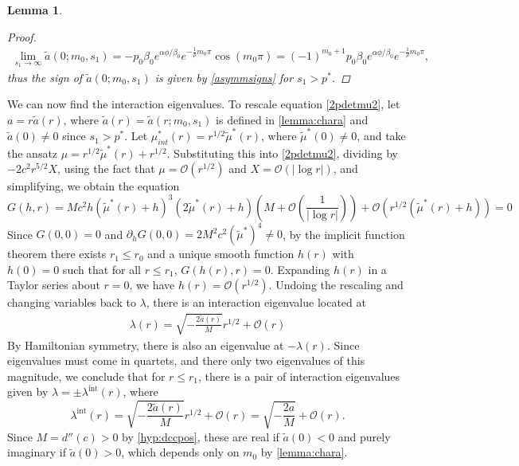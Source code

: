 \documentclass[10pt,reqno]{amsart}
\theoremstyle{plain}
\newtheorem{lemma}[theorem]{Lemma}
\theoremstyle{definition}
\theoremstyle{remark}
\numberwithin{theorem}{section}
\numberwithin{equation}{section}
\begin{document}
\begin{lemma}
\begin{proof}
\begin{align*}
\lim_{s_1 \rightarrow \infty}
\tilde{a}(0; m_0, s_1) = -p_0 \beta_0 e^{\alpha \phi/\beta_0} e^{-\frac{1}{\rho} m_0 \pi} \cos(m_0 \pi) = (-1)^{m_0+1} p_0 \beta_0 e^{\alpha \phi/\beta_0} e^{-\frac{1}{\rho} m_0 \pi},
\end{align*}
thus the sign of $\tilde{a}(0; m_0, s_1)$ is given by \cref{asymmsigns} for $s_1 > p^*$.
\end{proof}
\end{lemma}

We can now find the interaction eigenvalues. To rescale equation \cref{2pdetmu2}, let $a = r \tilde{a}(r)$, where $\tilde{a}(r) = \tilde{a}(r; m_0, s_1)$ is defined in \cref{lemma:chara} and $\tilde{a}(0) \neq 0$ since $s_1 > p^*$. Let $\mu^*_{int}(r) = r^{1/2} \tilde{\mu}^*(r)$, where $\tilde{\mu}^*(0) \neq 0$, and take the ansatz $\mu = r^{1/2} \tilde{\mu}^*(r) + r^{1/2}$. Substituting this into \cref{2pdetmu2}, dividing by $-2 c^2 r^{5/2} X$, using the fact that $\mu = \mathcal{O}(r^{1/2})$ and $X = \mathcal{O}(|\log r|)$, and simplifying, we obtain the equation
\[
G(h, r) = M c^2 h (\tilde{\mu}^*(r) + h)^3 (2 \tilde{\mu}^*(r) + h)
\left( M + \mathcal{O}\left(\frac{1}{|\log r|} \right) \right)
 + \mathcal{O}\left( r^{1/2}(\tilde{\mu}^*(r) + h) \right) = 0
\]
Since $G(0, 0) = 0$ and $\partial_h G(0, 0) = 2 M^2 c^2 (\tilde{\mu}^*)^4 \neq 0$, by the implicit function theorem there exists $r_1 \leq r_0$ and a unique smooth function $h(r)$ with $h(0) = 0$ such that for all $r \leq r_1$, $G(h(r), r) = 0$. Expanding $h(r)$ in a Taylor series about $r = 0$, we have $h(r) = \mathcal{O}(r^{1/2})$. Undoing the rescaling and changing variables back to $\lambda$, there is an interaction eigenvalue located at 
\begin{align*}
\lambda(r) = \sqrt{-\frac{2 \tilde{a}(r)}{M}}r^{1/2} + \mathcal{O}(r)
\end{align*}
By Hamiltonian symmetry, there is also an eigenvalue at $-\lambda(r)$. Since eigenvalues must come in quartets, and there only two eigenvalues of this magnitude, we conclude that for $r \leq r_1$, there is a pair of interaction eigenvalues given by $\lambda = \pm \lambda^{\text{int}}(r)$, where
\[
\lambda^{\text{int}}(r) = \sqrt{ -\frac{2 \tilde{a}(r)}{M} }r^{1/2} + \mathcal{O}(r) 
= \sqrt{ -\frac{2 a}{M} } + \mathcal{O}(r).
\]
Since $M = d''(c) > 0$ by \cref{hyp:dccpos}, these are real if $\tilde{a}(0) < 0$ and purely imaginary if $\tilde{a}(0) > 0$, which depends only on $m_0$ by \cref{lemma:chara}.
\end{document}
